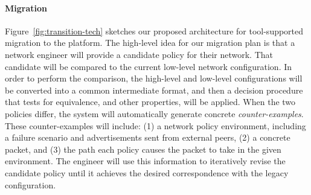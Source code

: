 \paragraph{Migration}  Figure~\ref{fig:transition-tech} sketches our proposed architecture for tool-supported migration 
to the \Name platform.  The high-level idea for our migration plan is that a network engineer will
provide a candidate \Name policy for their network.  That candidate will be compared to
the current low-level network configuration.  In order to perform the comparison, the
high-level and low-level configurations will be converted into a common 
intermediate format, and then a decision procedure that tests for equivalence, and other properties, will be applied.
When the two policies differ, the system will automatically generate
concrete \emph{counter-examples}.  These counter-examples will
include: (1) a network policy environment, including a failure scenario and advertisements
sent from external peers, (2) a concrete packet, and (3) the path each policy causes the packet to take in the given environment.
The engineer will use this information to iteratively revise the 
candidate \Name policy until it achieves the desired correspondence with the legacy configuration.  



